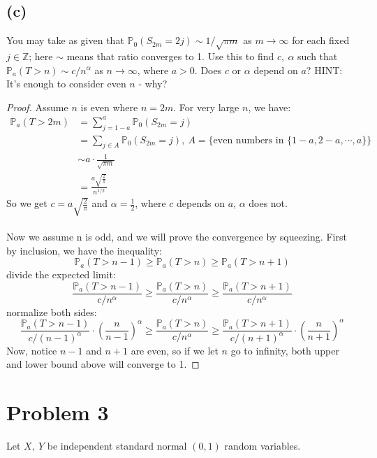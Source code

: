 \documentclass{article}
\newcommand{\prob}{\mathbb{P}}
\begin{document}
\subsection*{(c)}
You may take as given that $\mathbb{P}_0(S_{2m}=2j) \sim 1/\sqrt{\pi m}$ as $m \rightarrow \infty$ for each fixed $j\in\mathbb{Z}$; here $\sim$ means that ratio converges to 1. Use this to find $c,\ \alpha$ such that $\mathbb{P}_a(T>n)\sim c/n^{\alpha}$ as $n\rightarrow \infty$, where $a>0$. Does $c$ or $\alpha$ depend on $a$? HINT: It's enough to consider even $n$ - why?
\color{blue}
\begin{proof}
Assume $n$ is even where $n=2m$. For very large $n$, we have:
\begin{equation*}
    \begin{split}
        \prob_a(T>2m) &= \sum_{j=1-a}^a\mathbb{P}_0(S_{2m}=j)\\
            &= \sum_{j\in A}\mathbb{P}_0(S_{2m}=j),\ A=\{\text{even numbers in }\{1-a, 2-a, \cdots, a\}\}\\
            &\sim a\cdot \frac{1}{\sqrt{\pi m}}\\
            &= \frac{a\sqrt{\frac{2}{\pi}}}{n^{1/2}}
    \end{split}
\end{equation*}
So we get $c =a\sqrt{\frac{2}{\pi}} $ and $\alpha = \frac{1}{2}$, where $c$ depends on $a$, $\alpha$ does not. \\\\
Now we assume n is odd, and we will prove the convergence by squeezing. First by inclusion, we have the inequality:
\begin{equation*}
    \prob_a(T>n-1) \geq \prob_a(T>n) \geq \prob_a(T>n+1)
\end{equation*}
divide the expected limit:
\begin{equation*}
    \frac{\prob_a(T>n-1)}{c/n^{\alpha}} \geq \frac{\prob_a(T>n)}{c/n^{\alpha}} \geq \frac{\prob_a(T>n+1)}{c/n^{\alpha}}
\end{equation*}
normalize both sides:
\begin{equation*}
    \frac{\prob_a(T>n-1)}{c/(n-1)^{\alpha}}\cdot\left(\frac{n}{n-1}\right)^\alpha \geq \frac{\prob_a(T>n)}{c/n^{\alpha}} \geq \frac{\prob_a(T>n+1)}{c/(n+1)^{\alpha}}\cdot\left(\frac{n}{n+1}\right)^\alpha
\end{equation*}
Now, notice $n-1$ and $n+1$ are even, so if we let $n$ go to infinity, both upper and lower bound above will converge to 1.
\end{proof}
\color{black}
\section*{Problem 3}
Let $X,\ Y$ be independent standard normal $(0,1)$ random variables.
\end{document}
